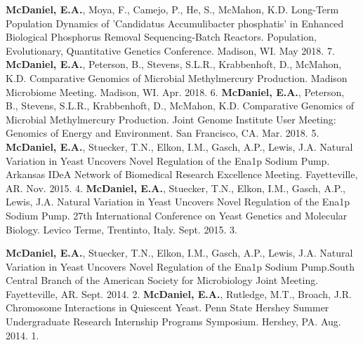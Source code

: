 


\begin{cvpubs}
    \cvpub
        {\textbf{McDaniel, E.A.}, Moya, F., Camejo, P., He, S., McMahon, K.D. Long-Term Population Dynamics of 'Candidatus Accumulibacter phosphatis' in Enhanced Biological Phosphorus Removal Sequencing-Batch Reactors. Population, Evolutionary, Quantitative Genetics Conference. Madison, WI. May 2018.} %
        {7.} %
    \cvpub
        {\textbf{McDaniel, E.A.}, Peterson, B., Stevens, S.L.R., Krabbenhoft, D., McMahon, K.D. Comparative Genomics of Microbial Methylmercury Production. Madison Microbiome Meeting. Madison, WI. Apr. 2018.} %
        {6.} %
    \cvpub
        {\textbf{McDaniel, E.A.}, Peterson, B., Stevens, S.L.R., Krabbenhoft, D., McMahon, K.D. Comparative Genomics of Microbial Methylmercury Production. Joint Genome Institute User Meeting: Genomics of Energy and Environment. San Francisco, CA. Mar. 2018.} %
        {5.} %
    \cvpub
        {\textbf{McDaniel, E.A.}, Stuecker, T.N., Elkon, I.M., Gasch, A.P., Lewis, J.A. Natural Variation in Yeast Uncovers Novel Regulation of the Ena1p Sodium Pump. Arkansas IDeA Network of Biomedical Research Excellence Meeting. Fayetteville, AR. Nov. 2015.}       
        {4.}
    \cvpub
        {\textbf{McDaniel, E.A.}, Stuecker, T.N., Elkon, I.M., Gasch, A.P., Lewis, J.A. Natural Variation in Yeast Uncovers Novel Regulation of the Ena1p Sodium Pump. 27th International Conference on Yeast Genetics and Molecular Biology. Levico Terme, Trentinto, Italy. Sept. 2015.}
        {3.}
\end{cvpubs}
\newpage
\begin{cvpubs}
    \cvpub
        {\textbf{McDaniel, E.A.}, Stuecker, T.N., Elkon, I.M., Gasch, A.P., Lewis, J.A. Natural Variation in Yeast Uncovers Novel Regulation of the Ena1p Sodium Pump.South Central Branch of the American Society for Microbiology Joint Meeting. Fayetteville, AR. Sept. 2014.}
        {2.}
    \cvpub
        {\textbf{McDaniel, E.A.}, Rutledge, M.T., Broach, J.R. Chromosome Interactions in Quiescent Yeast. Penn State Hershey Summer Undergraduate Research Internship Programs Symposium. Hershey, PA. Aug. 2014.}
        {1.}
\end{cvpubs}
